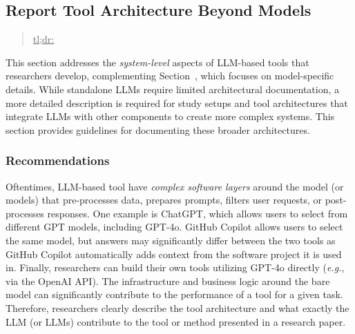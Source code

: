 



\subsection{Report Tool Architecture Beyond Models}
\label{sec:report-tool-architecture-beyond-models}

\begin{quote}
\underline{tl;dr:} 
\end{quote}

This section addresses the \emph{system-level} aspects of LLM-based tools that researchers develop, complementing Section~\modelversion, which focuses on model-specific details.
While standalone LLMs require limited architectural documentation, a more detailed description is required for study setups and tool architectures that integrate LLMs with other components to create more complex systems.
This section provides guidelines for documenting these broader architectures.

\subsubsection{Recommendations}

Oftentimes, LLM-based tool have \emph{complex software layers} around the model (or models) that pre-processes data, prepares prompts, filters user requests, or post-processes responses.
One example is ChatGPT, which allows users to select from different GPT models, including GPT-4o.
GitHub Copilot allows users to select the same model, but answers may significantly differ between the two tools as GitHub Copilot automatically adds context from the software project it is used in.
Finally, researchers can build their own tools utilizing GPT-4o directly (\textit{e.g.}, via the OpenAI API).
The infrastructure and business logic around the bare model can significantly contribute to the performance of a tool for a given task.
Therefore, researchers \must clearly describe the tool architecture and what exactly the LLM (or LLMs) contribute to the tool or method presented in a research paper.

